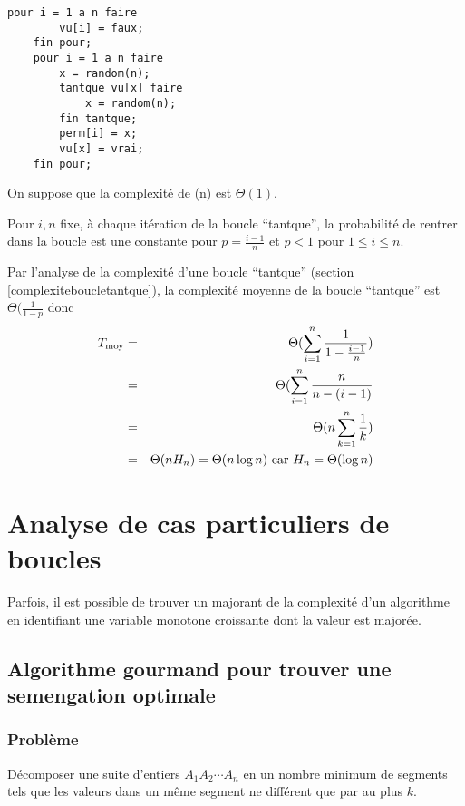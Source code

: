 	\begin{lstlisting}[language=algo, caption=Génération d'une permutation aléatoire]
	pour i = 1 a n faire 
		vu[i] = faux;
	fin pour;
	pour i = 1 a n faire
		x = random(n);
		tantque vu[x] faire
			x = random(n);
		fin tantque;
		perm[i] = x;
		vu[x] = vrai;
	fin pour;
	\end{lstlisting}
	On suppose que la complexité de \random(n) est $\Theta (1)$. 

	Pour $i, n$ fixe, à chaque itération de la boucle ``tantque'', la probabilité de rentrer dans la boucle est une constante pour 
	$p=\frac{i-1}{n}$ et $p < 1$ pour $1 \leq i \leq n$.

	Par l'analyse de la complexité d'une boucle ``tantque'' (section \ref{complexiteboucletantque}), 
	la complexité moyenne de la boucle ``tantque'' est $\Theta (\frac{1}{1-p}$ donc 
	\begin{eqnarray*}
		T_{\textrm{moy}} &=& \Theta(\sum^n_{i=1}\frac{1}{1-\frac{i-1}{n}})\\
		&=& \Theta(\sum^n_{i=1}\frac{n}{n-(i-1)}\\
		&=& \Theta(n\sum^n_{k=1}\frac{1}{k})\\
		&=&\Theta(n H_n)=\Theta(n\log n) \textrm{ car } H_n = \Theta(\log n)
	\end{eqnarray*}


	\section{Analyse de cas particuliers de boucles}
		Parfois, il est possible de trouver un majorant de la complexité d'un algorithme en identifiant une variable monotone croissante dont la valeur
		est majorée.
		\subsection{Algorithme gourmand pour trouver une semengation optimale}
		\subsubsection{Problème} Décomposer une suite d'entiers $A_1A_2\cdots A_n$ en un nombre minimum de segments tels que les valeurs dans un même segment
		ne différent que par au plus $k$.
